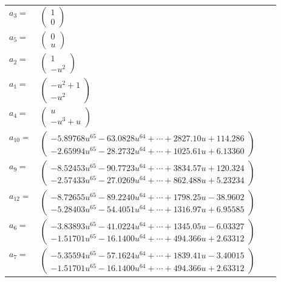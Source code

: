 \documentclass[1p]{elsarticle_modified}
\theoremstyle{definition}
\begin{document}
\begin{tabular}{m{7pt} m{180pt} m{7pt} m{180pt} }
\flushright $a_{3}=$&$\begin{pmatrix}1\\0\end{pmatrix}$ \\
\flushright $a_{5}=$&$\begin{pmatrix}0\\u\end{pmatrix}$ \\
\flushright $a_{2}=$&$\begin{pmatrix}1\\- u^2\end{pmatrix}$ \\
\flushright $a_{1}=$&$\begin{pmatrix}- u^2+1\\- u^2\end{pmatrix}$ \\
\flushright $a_{4}=$&$\begin{pmatrix}u\\- u^3+u\end{pmatrix}$ \\
\flushright $a_{10}=$&$\begin{pmatrix}-5.89768 u^{65}-63.0828 u^{64}+\cdots+2827.10 u+114.286\\-2.65994 u^{65}-28.2732 u^{64}+\cdots+1025.61 u+6.13360\end{pmatrix}$ \\
\flushright $a_{9}=$&$\begin{pmatrix}-8.52453 u^{65}-90.7723 u^{64}+\cdots+3834.57 u+120.324\\-2.57433 u^{65}-27.0269 u^{64}+\cdots+862.488 u+5.23234\end{pmatrix}$ \\
\flushright $a_{12}=$&$\begin{pmatrix}-8.72655 u^{65}-89.2240 u^{64}+\cdots+1798.25 u-38.9602\\-5.28403 u^{65}-54.4051 u^{64}+\cdots+1316.97 u+6.95585\end{pmatrix}$ \\
\flushright $a_{6}=$&$\begin{pmatrix}-3.83893 u^{65}-41.0224 u^{64}+\cdots+1345.05 u-6.03327\\-1.51701 u^{65}-16.1400 u^{64}+\cdots+494.366 u+2.63312\end{pmatrix}$ \\
\flushright $a_{7}=$&$\begin{pmatrix}-5.35594 u^{65}-57.1624 u^{64}+\cdots+1839.41 u-3.40015\\-1.51701 u^{65}-16.1400 u^{64}+\cdots+494.366 u+2.63312\end{pmatrix}$ \\

\end{tabular}
\end{document}

